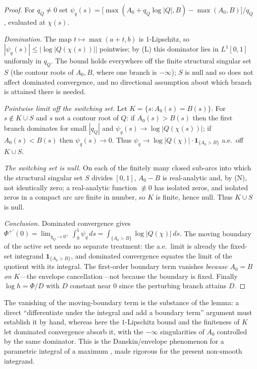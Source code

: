 \documentclass[11pt,reqno]{amsart}
\theoremstyle{plain}
\theoremstyle{definition}
\theoremstyle{remark}
\begin{document}
\begin{proof}
For $q_Q\ne0$ set $\psi_q(s)=\bigl[\max(A_0+q_Q\log|Q|,B)-\max(A_0,B)\bigr]/q_Q$,
evaluated at $\chi(s)$.

\emph{Domination.} The map $t\mapsto\max(a+t,b)$ is $1$-Lipschitz, so
$|\psi_q(s)|\le|\log|Q(\chi(s))||$ pointwise; by (L) this dominator lies in $L^1[0,1]$
uniformly in $q_Q$. The bound holds everywhere off the finite structural singular set
$S$ (the contour roots of $A_0,B$, where one branch is $-\infty$); $S$ is null and so
does not affect dominated convergence, and no directional assumption about which branch
is attained there is needed.

\emph{Pointwise limit off the switching set.} Let $K=\{s:A_0(s)=B(s)\}$. For
$s\notin K\cup S$ and $s$ not a contour root of $Q$: if $A_0(s)>B(s)$ then the first
branch dominates for small $|q_Q|$ and $\psi_q(s)\to\log|Q(\chi(s))|$; if $A_0(s)<B(s)$
then $\psi_q(s)\to0$. Thus $\psi_q\to\log|Q(\chi)|\cdot\mathbf 1_{\{A_0>B\}}$ a.e.\ off
$K\cup S$.

\emph{The switching set is null.} On each of the finitely many closed sub-arcs into
which the structural singular set $S$ divides $[0,1]$, $A_0-B$ is real-analytic and, by
(N), not identically zero; a real-analytic function $\not\equiv0$ has isolated
zeros, and isolated zeros in a compact arc are finite in number, so $K$ is finite,
hence null. Thus $K\cup S$ is null.

\emph{Conclusion.} Dominated convergence gives
$\Phi^{+\prime}(0)=\lim_{q_Q\to0^+}\int_0^1\psi_q\,ds
=\int_{\{A_0>B\}}\log|Q(\chi)|\,ds$. The moving boundary of the active set needs no
separate treatment: the a.e.\ limit is already the fixed-set integrand
$\mathbf 1_{\{A_0>B\}}$, and dominated convergence equates the limit of the quotient
with its integral. The first-order boundary term vanishes \emph{because $A_0=B$ on
$K$}---the envelope cancellation---not because the boundary is fixed. Finally
$\log h=\Phi/D$ with $D$ constant near $0$ since the perturbing branch attains $D$.
\end{proof}

The vanishing of the moving-boundary term is the substance of the lemma: a direct
``differentiate under the integral and add a boundary term'' argument must establish
it by hand, whereas here the $1$-Lipschitz bound and the finiteness of $K$ let
dominated convergence absorb it, with the $-\infty$ singularities of $A_0$ controlled
by the same dominator. This is the Danskin/envelope phenomenon for a parametric
integral of a maximum \citep{Ber99}, made rigorous for the present non-smooth
integrand.
\end{document}
